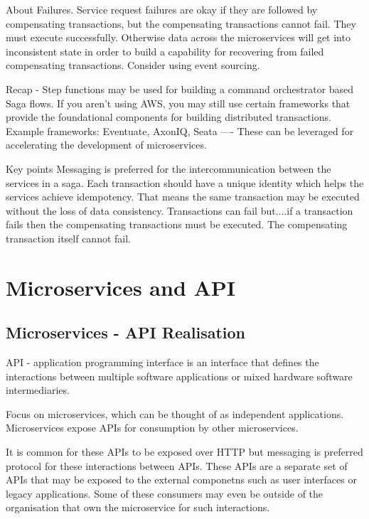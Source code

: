 About Failures.
Service request failures are okay if they are followed by compensating transactions, but the compensating transactions cannot fail.
They must execute successfully.
Otherwise data across the microservices will get into inconsistent state in order to build a capability for recovering from failed compensating transactions.
Consider using event sourcing.

Recap - Step functions may be used for building a command orchestrator based Saga flows.
If you aren't using AWS, you may still use certain frameworks that provide the foundational components for building distributed transactions.
Example frameworks: Eventuate, AxonIQ, Seata ---- These can be leveraged for accelerating the development of microservices.

Key points
Messaging is preferred for the intercommunication between the services in a saga.
Each transaction should have a unique identity which helps the services achieve idempotency.
That means the same transaction may be executed without the loss of data consistency.
Transactions can fail but....if a transaction fails then the compensating transactions must be executed.
The compensating transaction itself cannot fail.


\chapter{Microservices and API}

\section{Microservices - API Realisation}
API - application programming interface is an interface that defines the interactions between multiple software applications or mixed hardware software intermediaries.

Focus on microservices, which can be thought of as independent applications.
Microservices expose APIs for consumption by other microservices.

It is common for these APIs to be exposed over HTTP but messaging is preferred protocol for these interactions between APIs.
These APIs are a separate set of APIs that may be exposed to the external componetns such as user interfaces or legacy applications.
Some of these consumers may even be outside of the organisation that own the microservice for such interactions.

